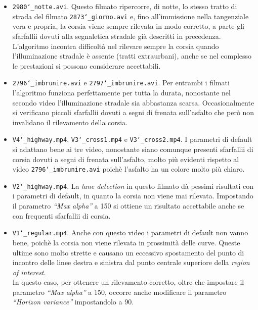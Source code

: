 \documentclass[12pt]{article}
\begin{document}
\begin{itemize}
\item \texttt{2980\char`_notte.avi}. Questo filmato ripercorre, di notte, lo stesso tratto di strada del filmato \texttt{2873\char`_giorno.avi} e, fino all'immissione nella tangenziale vera e propria, la corsia viene sempre rilevata in modo corretto, a parte gli sfarfallii dovuti alla segnaletica stradale già descritti in precedenza.\\
L'algoritmo incontra difficoltà nel rilevare sempre la corsia quando l'illuminazione stradale è assente (tratti extraurbani), anche se nel complesso le prestazioni si possono considerare accettabili.
\item \texttt{2796\char`_imbrunire.avi} e \texttt{2797\char`_imbrunire.avi}. Per entrambi i filmati l'algoritmo funziona perfettamente per tutta la durata, nonostante nel secondo video l'illuminazione stradale sia abbastanza scarsa. Occasionalmente si verificano piccoli sfarfallii dovuti a segni di frenata sull'asfalto che però non invalidano il rilevamento della corsia.
\item \texttt{V4\char`_highway.mp4}, \texttt{V3\char`_cross1.mp4} e \texttt{V3\char`_cross2.mp4}. I parametri di default si adattano bene ai tre video, nonostante siano comunque presenti sfarfallii di corsia dovuti a segni di frenata sull'asfalto, molto più evidenti rispetto al video \texttt{2796\char`_imbrunire.avi} poichè l'asfalto ha un colore molto più chiaro.
\item \texttt{V2\char`_highway.mp4}. La \textit{lane detection} in questo filmato dà pessimi risultati con i parametri di default, in quanto la corsia non viene mai rilevata. Impostando il parametro \textit{``Max alpha''} a 150 si ottiene un risultato accettabile anche se con frequenti sfarfallii di corsia.
\item \texttt{V1\char`_regular.mp4}. Anche con questo video i parametri di default non vanno bene, poichè la corsia non viene rilevata in prossimità delle curve. Queste ultime sono molto strette e causano un eccessivo spostamento del punto di incontro delle linee destra e sinistra dal punto centrale superiore della \textit{region of interest}.\\
In questo caso, per ottenere un rilevamento corretto, oltre che impostare il parametro \textit{``Max alpha''} a 150, occorre anche modificare il parametro \textit{``Horizon variance''} impostandolo a 90.
\end{itemize}


\newpage
\end{document}
